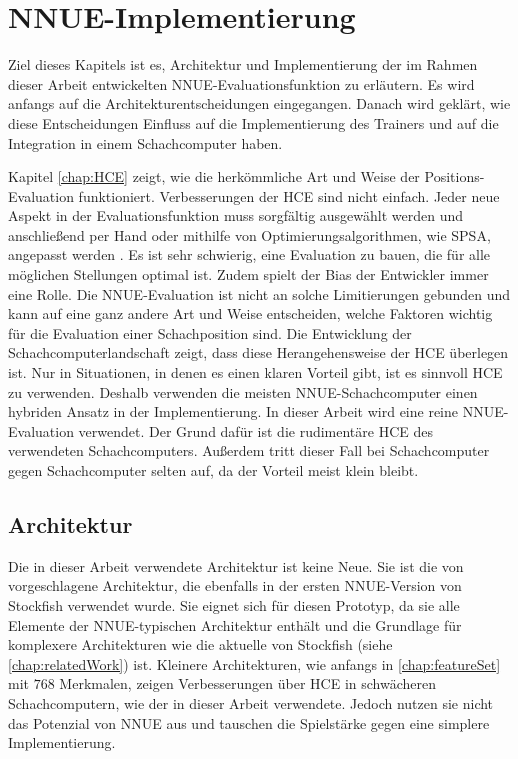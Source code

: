 \chapter{NNUE-Implementierung}

Ziel dieses Kapitels ist es, Architektur und Implementierung der im Rahmen dieser Arbeit entwickelten \ac{NNUE}-Evaluationsfunktion zu erläutern. Es wird anfangs auf die Architekturentscheidungen eingegangen. Danach wird geklärt, wie diese Entscheidungen Einfluss auf die Implementierung des Trainers und auf die Integration in einem Schachcomputer haben.

Kapitel \autoref{chap:HCE} zeigt, wie die herkömmliche Art und Weise der Positions-Evaluation funktioniert. Verbesserungen der \ac{HCE} sind nicht einfach. Jeder neue Aspekt in der Evaluationsfunktion muss sorgfältig ausgewählt werden und anschließend per Hand oder mithilfe von Optimierungsalgorithmen, wie \zb{} \ac{SPSA}, angepasst werden \cite{spall1992multivariate}. Es ist sehr schwierig, eine Evaluation zu bauen, die für alle möglichen Stellungen optimal ist. Zudem spielt der Bias der Entwickler immer eine Rolle. Die \ac{NNUE}-Evaluation ist nicht an solche Limitierungen gebunden und kann auf eine ganz andere Art und Weise entscheiden, welche Faktoren wichtig für die Evaluation einer Schachposition sind. Die Entwicklung der Schachcomputerlandschaft zeigt, dass diese Herangehensweise der \ac{HCE} überlegen ist. Nur in Situationen, in denen es einen klaren Vorteil gibt, ist es sinnvoll \ac{HCE} zu verwenden. Deshalb verwenden die meisten \ac{NNUE}-Schachcomputer einen hybriden Ansatz in der Implementierung. In dieser Arbeit wird eine reine \ac{NNUE}-Evaluation verwendet. Der Grund dafür ist die rudimentäre \ac{HCE} des verwendeten Schachcomputers. Außerdem tritt dieser Fall bei Schachcomputer gegen Schachcomputer selten auf, da der Vorteil meist klein bleibt.

\section{Architektur}

Die in dieser Arbeit verwendete Architektur ist keine Neue. Sie ist die von \citeauthor{YNasu2018} \cite{YNasu2018} vorgeschlagene Architektur, die ebenfalls in der ersten \ac{NNUE}-Version von Stockfish verwendet wurde. Sie eignet sich für diesen Prototyp, da sie alle Elemente der \ac{NNUE}-typischen Architektur enthält und die Grundlage für komplexere Architekturen wie die aktuelle von Stockfish (siehe \autoref{chap:relatedWork}) ist. Kleinere Architekturen, wie anfangs in \autoref{chap:featureSet} mit $768$ Merkmalen, zeigen Verbesserungen über \ac{HCE} in schwächeren Schachcomputern, wie der in dieser Arbeit verwendete. Jedoch nutzen sie nicht das Potenzial von \ac{NNUE} aus und tauschen die Spielstärke gegen eine simplere Implementierung.


